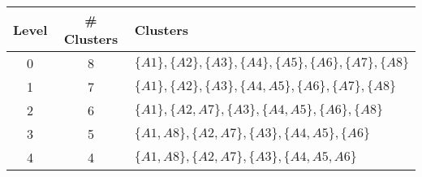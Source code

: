 \documentclass[aspectratio=169, 10pt]{beamer}
\begin{document}
\begin{frame}[t]
    \begin{table}[]
        \scriptsize
        \begin{tabular}{c|c|l}
        Level & \# Clusters & Clusters \\ \hline
        0     & 8           & $\{A1\}, \{A2\}, \{A3\}, \{A4\}, \{A5\}, \{A6\}, \{A7\}, \{A8\}$\\
        1     & 7           & $\{A1\}, \{A2\}, \{A3\}, \{A4, A5\}, \{A6\}, \{A7\}, \{A8\}$\\
        2     & 6           & $\{A1\}, \{A2, A7\}, \{A3\}, \{A4, A5\}, \{A6\}, \{A8\}$\\
        3     & 5           & $\{A1, A8\}, \{A2, A7\}, \{A3\}, \{A4, A5\}, \{A6\}$\\
        4     & 4           & $\{A1, A8\}, \{A2, A7\}, \{A3\}, \{A4, A5, A6\}$\\
        \end{tabular}
    \end{table}

\end{frame}
\end{document}
